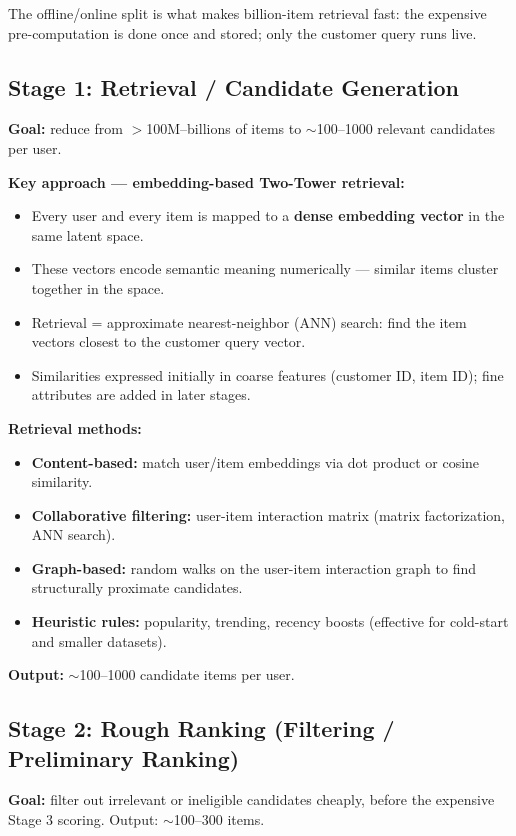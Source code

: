 \documentclass[11pt]{article}
\begin{document}
The offline/online split is what makes billion-item retrieval fast: the
expensive pre-computation is done once and stored; only the customer query
runs live.

\subsection{Stage 1: Retrieval / Candidate Generation}
\textbf{Goal:} reduce from $>$100M--billions of items to $\sim$100--1000
relevant candidates per user.

\textbf{Key approach --- embedding-based Two-Tower retrieval:}
\begin{itemize}
    \item Every user and every item is mapped to a \textbf{dense embedding
      vector} in the same latent space.
    \item These vectors encode semantic meaning numerically --- similar
      items cluster together in the space.
    \item Retrieval = approximate nearest-neighbor (ANN) search: find the
      item vectors closest to the customer query vector.
    \item Similarities expressed initially in coarse features (customer ID,
      item ID); fine attributes are added in later stages.
\end{itemize}

\textbf{Retrieval methods:}
\begin{itemize}
    \item \textbf{Content-based:} match user/item embeddings via dot product
      or cosine similarity.
    \item \textbf{Collaborative filtering:} user-item interaction matrix
      (matrix factorization, ANN search).
    \item \textbf{Graph-based:} random walks on the user-item interaction
      graph to find structurally proximate candidates.
    \item \textbf{Heuristic rules:} popularity, trending, recency boosts
      (effective for cold-start and smaller datasets).
\end{itemize}

\textbf{Output:} $\sim$100--1000 candidate items per user.

\subsection{Stage 2: Rough Ranking (Filtering / Preliminary Ranking)}
\textbf{Goal:} filter out irrelevant or ineligible candidates cheaply,
before the expensive Stage 3 scoring. Output: $\sim$100--300 items.
\end{document}
